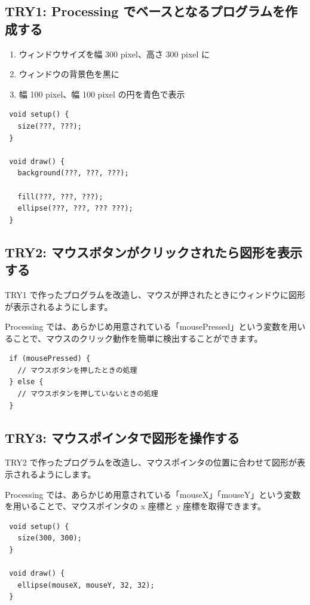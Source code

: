 \documentclass[11pt,a4paper]{jarticle}
\begin{document}
\subsection*{TRY1: Processing でベースとなるプログラムを作成する}
\begin{enumerate}
 \item ウィンドウサイズを幅 300 pixel、高さ 300 pixel に
 \item ウィンドウの背景色を黒に
 \item 幅 100 pixel、幅 100 pixel の円を青色で表示
\end{enumerate}

\begin{lstlisting}
 void setup() {
   size(???, ???);
 }

 void draw() {
   background(???, ???, ???);

   fill(???, ???, ???);
   ellipse(???, ???, ??? ???);
 }
\end{lstlisting}

\subsection*{TRY2: マウスボタンがクリックされたら図形を表示する}
TRY1 で作ったプログラムを改造し、マウスが押されたときにウィンドウに図形が表示されるようにします。

Processing では、あらかじめ用意されている「mousePressed」という変数を用いることで、マウスのクリック動作を簡単に検出することができます。
\begin{lstlisting}
 if (mousePressed) {
   // マウスボタンを押したときの処理
 } else {
   // マウスボタンを押していないときの処理
 }
\end{lstlisting}


\subsection*{TRY3: マウスポインタで図形を操作する}
TRY2 で作ったプログラムを改造し、マウスポインタの位置に合わせて図形が表示されるようにします。

Processing では、あらかじめ用意されている「mouseX」「mouseY」という変数を用いることで、マウスポインタの x 座標と y 座標を取得できます。


\begin{lstlisting}
 void setup() {
   size(300, 300);
 }

 void draw() {
   ellipse(mouseX, mouseY, 32, 32);
 }
\end{lstlisting}
\end{document}
